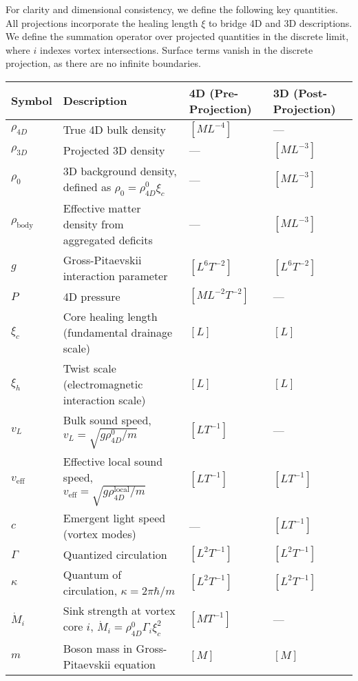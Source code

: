 For clarity and dimensional consistency, we define the following key quantities. All projections incorporate the healing length $\xi$ to bridge 4D and 3D descriptions. We define the summation operator over projected quantities in the discrete limit, where $i$ indexes vortex intersections. Surface terms vanish in the discrete projection, as there are no infinite boundaries.

\begin{table}[H]
\centering
\begingroup
\small
\begin{tabularx}{\textwidth}{|l|Y|l|l|}
\hline
Symbol & Description & 4D (Pre-Projection) & 3D (Post-Projection) \\
\hline
$\rho_{4D}$ & True 4D bulk density & $[M L^{-4}]$ & --- \\
\hline
$\rho_{3D}$ & Projected 3D density & --- & $[M L^{-3}]$ \\
\hline
$\rho_0$ & 3D background density, defined as $\rho_0 = \rho_{4D}^0 \xi_c$ & --- & $[M L^{-3}]$ \\
\hline
$\rho_{\text{body}}$ & Effective matter density from aggregated deficits & --- & $[M L^{-3}]$ \\
\hline
$g$ & Gross-Pitaevskii interaction parameter & $[L^6 T^{-2}]$ & $[L^6 T^{-2}]$ \\
\hline
$P$ & 4D pressure & $[M L^{-2} T^{-2}]$ & --- \\
\hline
$\xi_c$ & Core healing length (fundamental drainage scale) & $[L]$ & $[L]$ \\
\hline
$\xi_h$ & Twist scale (electromagnetic interaction scale) & $[L]$ & $[L]$ \\
\hline
$v_L$ & Bulk sound speed, $v_L = \sqrt{g \rho_{4D}^0 / m}$ & $[L T^{-1}]$ & --- \\
\hline
$v_{\text{eff}}$ & Effective local sound speed, $v_{\text{eff}} = \sqrt{g \rho_{4D}^{\text{local}} / m}$ & $[L T^{-1}]$ & $[L T^{-1}]$ \\
\hline
$c$ & Emergent light speed (vortex modes) & --- & $[L T^{-1}]$ \\
\hline
$\Gamma$ & Quantized circulation & $[L^2 T^{-1}]$ & $[L^2 T^{-1}]$ \\
\hline
$\kappa$ & Quantum of circulation, $\kappa = 2 \pi \hbar / m$ & $[L^2 T^{-1}]$ & $[L^2 T^{-1}]$ \\
\hline
$\dot{M}_i$ & Sink strength at vortex core $i$, $\dot{M}_i = \rho_{4D}^0 \Gamma_i \xi_c^2$ & $[M T^{-1}]$ & --- \\
\hline
$m$ & Boson mass in Gross-Pitaevskii equation & $[M]$ & $[M]$ \\

\end{tabularx}
\end{table}
